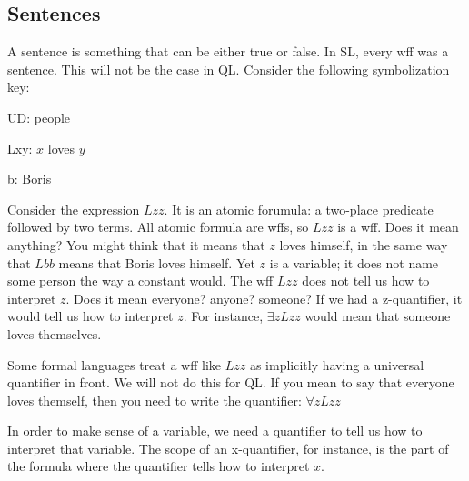 





\subsection{Sentences}

A {sentence} is something that can be either true or false. In SL, every wff was a sentence. This will not be the case in QL. Consider the following symbolization key:
\begin{ekey}
\item[UD:] people
\item[Lxy:] $x$ loves $y$
\item[b:] Boris
\end{ekey}
Consider the expression $Lzz$. It is an atomic forumula: a two-place predicate followed by two terms. All atomic formula are wffs, so $Lzz$ is a wff. Does it mean anything? You might think that it means that $z$ loves himself, in the same way that $Lbb$ means that Boris loves himself. Yet $z$ is a variable; it does not name some person the way a constant would. The wff $Lzz$ does not tell us how to interpret $z$. Does it mean everyone? anyone? someone? If we had a z-quantifier, it would tell us how to interpret $z$. For instance, $\exists zLzz$ would mean that someone loves themselves.

Some formal languages treat a wff like $Lzz$ as implicitly having a universal quantifier in front. We will not do this for QL. If you mean to say that everyone loves themself, then you need to write the quantifier: $\forall zLzz$

In order to make sense of a variable, we need a quantifier to tell us how to interpret that variable. The scope of an x-quantifier, for instance, is the part of the formula where the quantifier tells how to interpret $x$.

